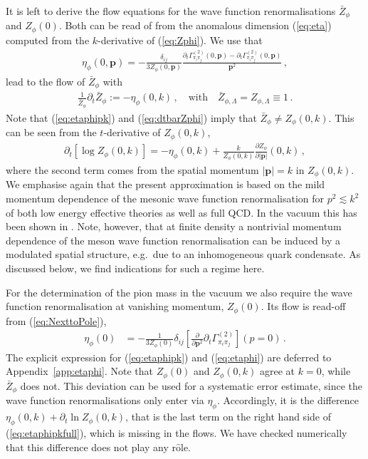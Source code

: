 \documentclass[%
reprint,
superscriptaddress,
showpacs,preprintnumbers,
 amsmath,amssymb,
 aps,
prd,
]{revtex4-1}
\def\eq#1{(\ref{#1})}
\def\app#1{Appendix~\ref{#1}}
\begin{document}
It is left to derive the flow equations for the wave function
renormalisations $\bar Z_\phi$ and $Z_\phi(0)$. Both can be read of
from the anomalous dimension \eq{eq:eta} computed from the
$k$-derivative of \eq{eq:Zphi}. We use that 
%
\begin{align}
  \eta_{\phi}(0,\bm{p})=
                           -\frac{\delta_{ij}}{3Z_{\phi}(0,\bm{p})}
                            \frac{\partial_t
                            \Gamma_{\pi_i\pi_j}^{(2)}(0,\bm{p})
  -\partial_t \Gamma_{\pi_i\pi_j}^{(2)}(0,\bm{p})}{\bm{p}^2}
  \,,
                           \label{eq:etaphipk}
\end{align}
%
lead to the flow of $\bar Z_\phi$ with
%
\begin{align}\label{eq:dtbarZphi}
  \frac{1}{\bar Z_\phi} \partial_t \bar Z_\phi:= - \eta_\phi(0,k)\,,
  \quad \textrm{with}\quad
  \bar Z_{\phi,\Lambda}=Z_{\phi,\Lambda}\equiv 1\,.
\end{align}
%
Note that \eq{eq:etaphipk} and \eq{eq:dtbarZphi} imply that
$\bar Z_\phi\neq Z_\phi(0,k)$. This can be seen from the
$t$-derivative of $Z_\phi(0,k)$, 
%
\begin{align}
  \partial_t \left[\log Z_\phi(0,k) \right]= - \eta_{\phi}(0,k) 
                           +\frac{k}{Z_{\phi}(0,k)} 
                            \frac{\partial 
                            Z_\phi}{\partial |\bm{p}|}(0,k)\,, 
                           \label{eq:etaphipkfull}
\end{align}
%
where the second term comes from the spatial momentum $|\bm{p}| =k$ in
$Z_\phi(0,k)$.  We emphasise again that the present approximation is
based on the mild momentum dependence of the mesonic wave function
renormalisation for $p^2 \lesssim k^2$ of both low energy effective
theories as well as full QCD. In the vacuum this has been shown in
\cite{Helmboldt:2014iya, Mitter:2014wpa, Cyrol:2017ewj}.  Note,
however, that at finite density a nontrivial momentum dependence of
the meson wave function renormalisation can be induced by a modulated
spatial structure, e.g.\ due to an inhomogeneous quark condensate. As
discussed below, we find indications for such a regime here.

For the determination of the pion mass in the vacuum we also require
the wave function renormalisation at vanishing momentum,
$Z_\phi(0)$. Its flow is read-off from \eq{eq:NexttoPole}, 
%
\begin{align}
  \eta_{\phi}(0)&=
                  -\frac{1}{3Z_{\phi}(0)}\delta_{ij}\left[
                  \frac{\partial}{\partial  \bm{p}^2}\partial_t
                  \Gamma^{(2)}_{\pi_i\pi_j}\right](p=0)\,.
                           \label{eq:etaphi}
\end{align}
%
The explicit expression for \eq{eq:etaphipk} and \eq{eq:etaphi} are
deferred to \app{app:etaphi}.  Note that $Z_\phi(0)$ and $Z_\phi(0,k)$
agree at $k=0$, while $\bar Z_\phi$ does not. This deviation can be
used for a systematic error estimate, since the wave function
renormalisations only enter via $\eta_\phi$. Accordingly, it is the
difference $\eta_\phi(0,k)+\partial_t \ln Z_\phi(0,k)$, that is the
last term on the right hand side of \eq{eq:etaphipkfull}, which is
missing in the flows. We have checked numerically that this difference
does not play any r$\hat{\textrm{o}}$le.
\end{document}
